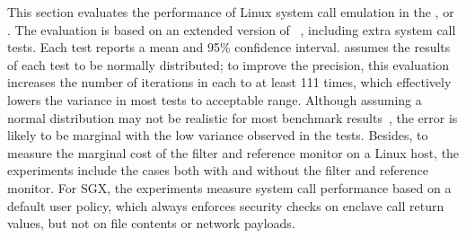 This section evaluates the performance
of Linux system call emulation
in the \graphene{} \libos{}, or \thelibos{}.
The evaluation is based on
an extended version of \lmbenchwithver{}~\cite{McVoy:lmbench},
including
extra system call tests.
Each \lmbench{} test
reports a mean and 95\% confidence interval.
\lmbench{} assumes the results of each test to be normally distributed;
to improve the precision,
this evaluation increases the number of iterations in each to at least 111 times, which effectively
lowers the variance in most tests to acceptable range.
Although assuming a normal distribution may not be realistic for most benchmark results~\cite{staelin05lmbench},
the error is likely to be marginal with the low variance
observed in the tests.
Besides, to measure the marginal cost of the \seccomp{} filter and reference monitor on a Linux host,
the experiments include the cases both with
and without the \seccomp{} filter and reference monitor.
For SGX, the experiments
measure system call performance based on a default user policy, which always enforces
security checks on enclave call return values,
but not on file contents
or network payloads.


